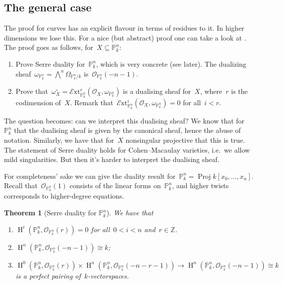 \documentclass[10pt,a4paper]{article}
\theoremstyle{lecture}
\newtheorem{theorem}{Theorem}
\newcommand\dash{\nobreakdash-\hspace{0pt}}
\DeclareMathOperator\HH{H}
\DeclareMathOperator\Proj{Proj}
\begin{document}
\subsection{The general case}
\label{subsection:remarks}
The proof for curves has an explicit flavour in terms of residues to it. In higher dimensions we lose this. For a nice (but abstract) proof one can take a look at \cite[\S III.7]{hartshorne-algebraic-geometry}. The proof goes as follows, for~$X\subseteq\mathbb{P}_k^n$:
\begin{enumerate}
  \item Prove Serre duality for~$\mathbb{P}_k^n$, which is very concrete (see later). The dualizing sheaf~$\omega_{\mathbb{P}_k^n}=\bigwedge^n\Omega_{\mathbb{P}_k^n/k}$ is~$\mathcal{O}_{\mathbb{P}_k^n}(-n-1)$.
  \item Prove that~$\omega_X^\circ=\mathcal{E}\mathrm{xt}^r_{\mathbb{P}_k^n}(\mathcal{O}_X,\omega_{\mathbb{P}_k^n})$ is a dualising sheaf for~$X$, where~$r$ is the codimension of~$X$. Remark that~$\mathcal{E}\mathrm{xt}_{\mathbb{P}_k^n}^i(\mathcal{O}_X,\omega_{\mathbb{P}_k^n})=0$ for all~$i<r$.
\end{enumerate}
The question becomes: can we interpret this dualising sheaf? We know that for~$\mathbb{P}_k^n$ that the dualising sheaf is given by the canonical sheaf, hence the abuse of notation. Similarly, we have that for~$X$ nonsingular projective that this is true. The statement of Serre duality holds for Cohen--Macaulay varieties, i.e.\ we allow mild singularities. But then it's harder to interpret the dualising sheaf.

For completeness' sake we can give the duality result for~$\mathbb{P}_k^n=\Proj k[x_0,\dotsc,x_n]$. Recall that~$\mathcal{O}_{\mathbb{P}_k^n}(1)$ consists of the linear forms on~$\mathbb{P}_k^n$, and higher twists corresponds to higher-degree equations.
\begin{theorem}[Serre duality for $\mathbb{P}_k^n$]
  \label{theorem:serre-duality-projective-space}
  We have that
  \begin{enumerate}
    \item $\HH^i(\mathbb{P}_k^n,\mathcal{O}_{\mathbb{P}_k^n}(r))=0$ for all~$0<i<n$ and~$r\in\mathbb{Z}$.
    \item $\HH^n(\mathbb{P}_k^n,\mathcal{O}_{\mathbb{P}_k^n}(-n-1))\cong k$;
    \item $\HH^0(\mathbb{P}_k^n,\mathcal{O}_{\mathbb{P}_k^n}(r))\times\HH^n(\mathbb{P}_k^n,\mathcal{O}_{\mathbb{P}_k^n}(-n-r-1))\to\HH^n(\mathbb{P}_k^n,\mathcal{O}_{\mathbb{P}_k^n}(-n-1))\cong k$ is a perfect pairing of~$k$\dash vectorspaces.
  \end{enumerate}
\end{theorem}
\end{document}
